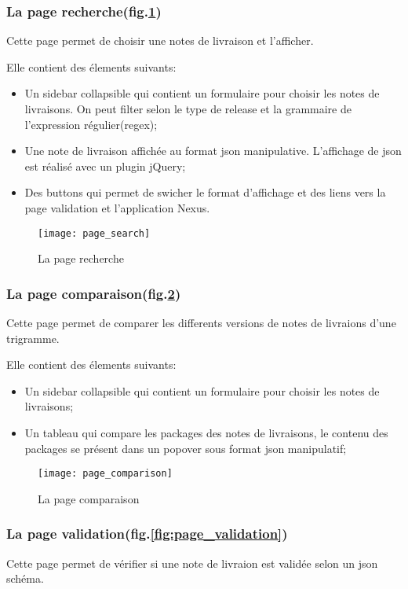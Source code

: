 \subsubsection{La page recherche(fig.\ref{fig:page_search})}
Cette page permet de choisir une notes de livraison et l'afficher.

Elle contient des élements suivants:
\begin{itemize}
 \item Un sidebar collapsible qui contient un formulaire pour choisir les notes de livraisons. On peut filter selon le type de release et la grammaire de l'expression régulier(regex);
 \item Une note de livraison affichée au format json manipulative. L'affichage de json est réalisé avec un plugin jQuery;
 \item Des buttons qui permet de swicher le format d'affichage et des liens vers la page validation et l'application Nexus.
\end{itemize}

\begin{figure}[ht]
 \centering
 \texttt{[image: page\_search]}
 \caption{La page recherche}
 \label{fig:page_search}
\end{figure}

\subsubsection{La page comparaison(fig.\ref{fig:page_comparaison})}
Cette page permet de comparer les differents versions de notes de livraions d'une trigramme.

Elle contient des élements suivants:
\begin{itemize}
 \item Un sidebar collapsible qui contient un formulaire pour choisir les notes de livraisons;
 \item Un tableau qui compare les packages des notes de livraisons, le contenu des packages se présent dans un popover sous format json manipulatif;
\end{itemize}

\begin{figure}[ht]
 \centering
 \texttt{[image: page\_comparison]}
 \caption{La page comparaison}
 \label{fig:page_comparaison}
\end{figure}

\subsubsection{La page validation(fig.\ref{fig:page_validation})}
Cette page permet de vérifier si une note de livraion est validée selon un json schéma.

